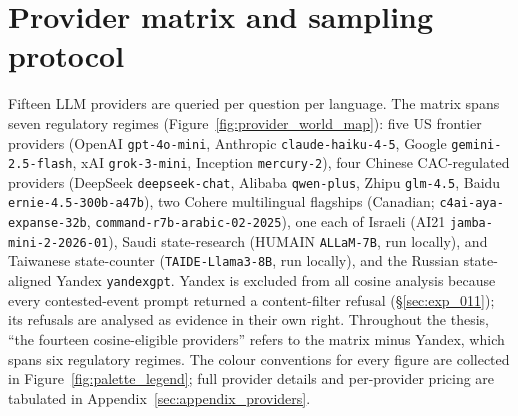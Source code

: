 \section{Provider matrix and sampling protocol}\label{sec:protocol}

{\sloppy
Fifteen LLM providers are queried per question per language. The
matrix spans seven regulatory regimes
(Figure~\ref{fig:provider_world_map}):
five US frontier providers
(OpenAI \verb|gpt-4o-mini|, Anthropic \verb|claude-haiku-4-5|, Google
\verb|gemini-2.5-flash|, xAI \verb|grok-3-mini|, Inception
\verb|mercury-2|), four Chinese CAC-regulated providers (DeepSeek
\verb|deepseek-chat|, Alibaba \verb|qwen-plus|, Zhipu
\verb|glm-4.5|, Baidu \verb|ernie-4.5-300b-a47b|), two Cohere
multilingual flagships (Canadian; \verb|c4ai-aya-expanse-32b|,
\verb|command-r7b-arabic-02-2025|), one each of Israeli (AI21
\verb|jamba-mini-2-2026-01|), Saudi state-research (HUMAIN
\verb|ALLaM-7B|, run locally), and Taiwanese state-counter
(\verb|TAIDE-Llama3-8B|, run locally), and the Russian state-aligned
Yandex \verb|yandexgpt|. Yandex is excluded from all cosine analysis
because every contested-event prompt returned a content-filter
refusal (\S\ref{sec:exp_011}); its refusals are analysed as evidence
in their own right. Throughout the thesis, ``the fourteen
cosine-eligible providers'' refers to the matrix minus Yandex, which
spans six regulatory regimes. The colour conventions for every
figure are collected in Figure~\ref{fig:palette_legend}; full
provider details and per-provider
pricing are tabulated in Appendix~\ref{sec:appendix_providers}.\par}

